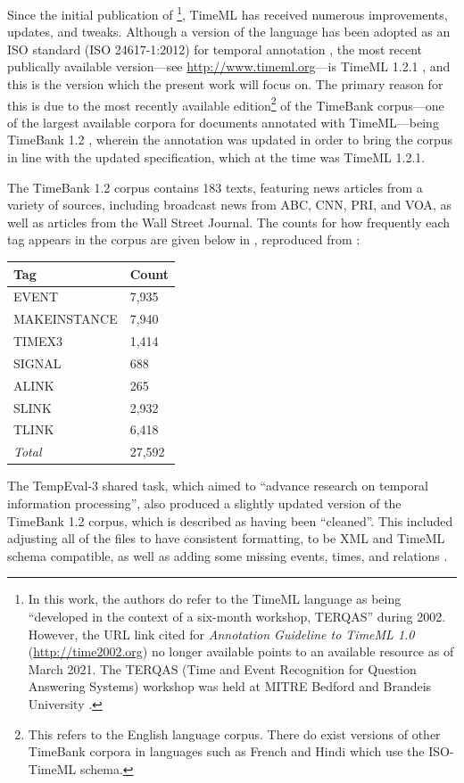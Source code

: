 \documentclass[a4paper,12pt,leqno,twoside]{article}
\begin{document}
Since the initial publication of \citet{pustejovsky2003timeml}\footnote{In this work, the authors do refer to the TimeML language as being ``developed in the context of a six-month workshop, TERQAS'' during 2002. However, the URL link cited for \textit{Annotation Guideline to TimeML 1.0} (\url{http://time2002.org}) no longer available points to an available resource as of March 2021. The TERQAS (Time and Event Recognition for Question Answering Systems) workshop was held at MITRE Bedford and Brandeis University \citep[p. 647]{pustejovsky2003timebank}.}, TimeML has received numerous improvements, updates, and tweaks. Although a version of the language has been adopted as an ISO standard (ISO 24617-1:2012) for temporal annotation \citep{pustejovsky2010iso}, the most recent publically available version---see \url{http://www.timeml.org}---is TimeML 1.2.1 \citep{timeml2005timeml,sauri2006timeml}, and this is the version which the present work will focus on. The primary reason for this is due to the most recently available edition\footnote{This refers to the English language corpus. There do exist versions of other TimeBank corpora in languages such as French \citep{bittar2011french} and Hindi \citep{goel2020hindi} which use the ISO-TimeML schema.} of the TimeBank corpus---one of the largest available corpora for documents annotated with TimeML---being TimeBank 1.2 \citep{pustejovsky2006timebank}, wherein the annotation was updated in order to bring the corpus in line with the updated specification, which at the time was TimeML 1.2.1.

The TimeBank 1.2 corpus contains 183 texts, featuring news articles from a variety of sources, including broadcast news from ABC, CNN, PRI, and VOA, as well as articles from the Wall Street Journal. The counts for how frequently each tag appears in the corpus are given below in , reproduced from \citet{pustejovsky2006timebank}:
\begin{center}
	\onehalfspacing
	\begin{tabular}[h!]{|l l|}
		\hline
		\textbf{Tag} & \textbf{Count}\\
		\hline
		EVENT & 7,935\\
		MAKEINSTANCE & 7,940\\
		TIMEX3 & 1,414\\
		SIGNAL & 688\\
		ALINK & 265\\
		SLINK & 2,932\\
		TLINK & 6,418\\
		\textit{Total} & 27,592\\
		\hline
	\end{tabular}
	\label{fig:timebank-stats}
\end{center}
The TempEval-3 \citep{uzzaman2013semeval} shared task, which aimed to ``advance research on temporal information processing'', also produced a slightly updated version of the TimeBank 1.2 corpus, which is described as having been ``cleaned''. This included adjusting all of the files to have consistent formatting, to be XML and TimeML schema compatible, as well as adding some missing events, times, and relations \citep[p. 2]{uzzaman2013semeval}.
\end{document}
